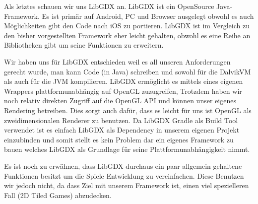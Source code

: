 Als letztes schauen wir uns LibGDX an. LibGDX ist ein OpenSource Java-Framework. Es ist primär auf Android, PC und Browser ausgelegt obwohl es auch Möglichkeiten gibt den Code nach iOS zu portieren. LibGDX ist im Vergleich zu den bisher vorgestellten Framework eher leicht gehalten, obwohl es eine Reihe an Bibliotheken gibt um seine Funktionen zu erweitern.

Wir haben uns für LibGDX entschieden weil es all unseren Anforderungen gerecht wurde, man kann Code (in Java) schreiben und sowohl für die DalvikVM als auch für die JVM kompilieren. LibGDX ermöglicht es mittels eines eigenen Wrappers plattformunabhängig auf OpenGL zuzugreifen, Trotzdem haben wir noch relativ direkten Zugriff auf die OpenGL API und können unser eigenes Rendering betreiben. Dies sorgt auch dafür, dass es leicht für uns ist OpenGL als zweidimensionalen Renderer zu benutzen.
Da LibGDX Gradle als Build Tool verwendet ist es einfach LibGDX als Dependency in unserem eigenen Projekt einzubinden und somit stellt es kein Problem dar ein eigenes Framework zu bauen welches LibGDX als Grundlage für seine Plattformunabhängigkeit nimmt.

Es ist noch zu erwähnen, dass LibGDX durchaus ein paar allgemein gehaltene Funktionen besitzt um die Spiele Entwicklung zu vereinfachen. Diese Benutzen wir jedoch nicht, da dass Ziel mit unserem Framework ist, einen viel spezielleren Fall (2D Tiled Games) abzudecken.
